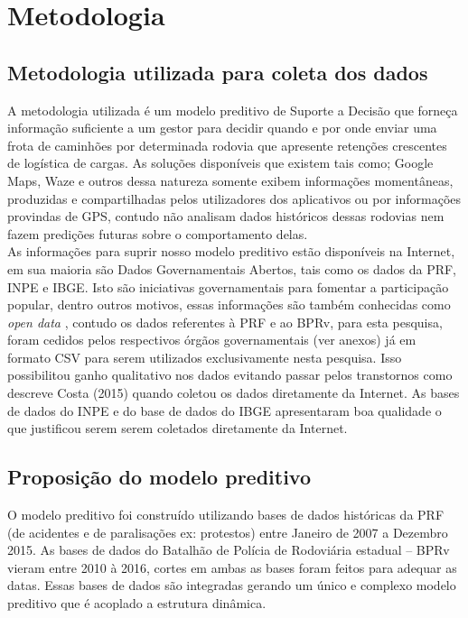\chapter{ Metodologia}\label{meto}


\section{ Metodologia utilizada para coleta dos dados}\label{intro:metodologia}

A metodologia utilizada é um modelo preditivo de Suporte a Decisão que forneça informação suficiente a um gestor para decidir quando e por onde 
enviar uma frota de caminhões por determinada rodovia que apresente retenções crescentes de logística de cargas. As soluções disponíveis que 
existem tais como; Google Maps, Waze e outros dessa natureza somente exibem informações momentâneas, produzidas e compartilhadas pelos utilizadores 
dos aplicativos ou por informações provindas de GPS, contudo não analisam dados históricos dessas rodovias nem fazem predições futuras sobre o 
comportamento delas. \\

As informações para suprir nosso modelo preditivo estão disponíveis na Internet, em sua maioria são Dados Governamentais Abertos, tais como os dados
da PRF, INPE e IBGE. Isto são iniciativas governamentais para fomentar a participação popular, dentro outros motivos, essas informações são também 
conhecidas como \textit{open data} \cite{DadosGoverno}, contudo os dados referentes à PRF e ao BPRv, para esta pesquisa, foram cedidos pelos respectivos 
órgãos governamentais (ver anexos) já em formato CSV para serem utilizados exclusivamente nesta pesquisa. Isso possibilitou ganho qualitativo nos dados evitando 
passar pelos transtornos como descreve Costa (2015) quando coletou os dados diretamente da Internet.\cite{Costa2015} 
As bases de dados do INPE e do base de dados do IBGE apresentaram boa qualidade o que justificou serem serem coletados diretamente da Internet.




\section{ Proposição do modelo preditivo}

O modelo preditivo foi construído utilizando bases de dados históricas da PRF (de acidentes e de paralisações ex: protestos) entre Janeiro de 2007 a 
Dezembro 2015. As bases de dados do Batalhão de Polícia de Rodoviária estadual -- BPRv vieram entre 2010 à 2016, cortes em ambas as bases foram 
feitos para adequar as datas. Essas bases de dados são integradas gerando um único e complexo modelo preditivo que é acoplado a estrutura dinâmica.

